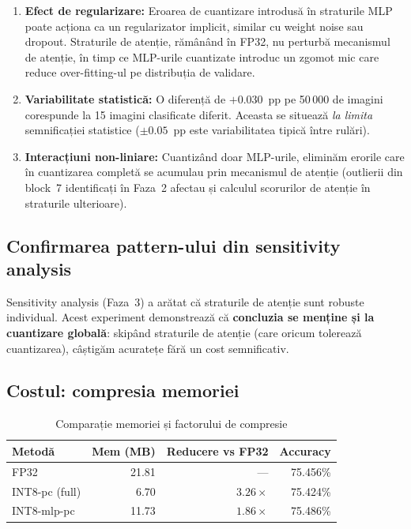 \documentclass[12pt,a4paper]{article}
\begin{document}
\begin{enumerate}
  \item \textbf{Efect de regularizare:} Eroarea de cuantizare introdusă
    în straturile MLP poate acționa ca un regularizator implicit, similar
    cu weight noise sau dropout. Straturile de atenție, rămânând în FP32,
    nu perturbă mecanismul de atenție, în timp ce MLP-urile cuantizate
    introduc un zgomot mic care reduce over-fitting-ul pe distribuția de
    validare.

  \item \textbf{Variabilitate statistică:} O diferență de $+0.030$~pp
    pe 50\,000 de imagini corespunde la 15 imagini clasificate diferit.
    Aceasta se situează \emph{la limita} semnificației statistice
    ($\pm 0.05$~pp este variabilitatea tipică între rulări).

  \item \textbf{Interacțiuni non-liniare:} Cuantizând doar MLP-urile,
    eliminăm erorile care în cuantizarea completă se acumulau prin
    mecanismul de atenție (outlierii din block~7 identificați în Faza~2
    afectau și calculul scorurilor de atenție în straturile ulterioare).
\end{enumerate}

\subsection{Confirmarea pattern-ului din sensitivity analysis}

Sensitivity analysis (Faza~3) a arătat că straturile de atenție sunt
robuste individual. Acest experiment demonstrează că \textbf{concluzia
se menține și la cuantizare globală}: skipând straturile de atenție
(care oricum tolerează cuantizarea), câștigăm acuratețe fără un cost
semnificativ.

\subsection{Costul: compresia memoriei}

\begin{table}[H]
  \centering
  \caption{Comparație memoriei și factorului de compresie}
  \begin{tabular}{lrrr}
    \toprule
    \textbf{Metodă} & \textbf{Mem (MB)} & \textbf{Reducere vs FP32} &
    \textbf{Accuracy} \\
    \midrule
    FP32           & 21.81 & ---         & 75.456\% \\
    INT8-pc (full) & \phantom{0}6.70  & $3.26\times$ & 75.424\% \\
    INT8-mlp-pc    & 11.73 & $1.86\times$ & 75.486\% \\
    \bottomrule
  \end{tabular}
  \label{tab:memory_tradeoff}
\end{table}
\end{document}
